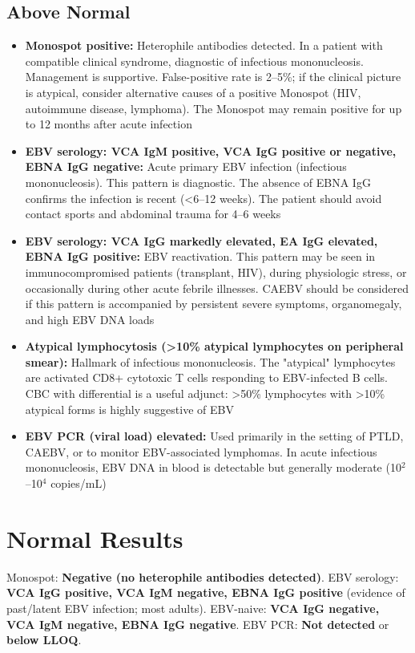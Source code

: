 \subsection*{Above Normal}
\begin{itemize}
  \item \textbf{Monospot positive:} Heterophile antibodies detected. In a patient with compatible clinical syndrome, diagnostic of infectious mononucleosis. Management is supportive. False-positive rate is 2--5\%; if the clinical picture is atypical, consider alternative causes of a positive Monospot (HIV, autoimmune disease, lymphoma). The Monospot may remain positive for up to 12 months after acute infection
  \item \textbf{EBV serology: VCA IgM positive, VCA IgG positive or negative, EBNA IgG negative:} Acute primary EBV infection (infectious mononucleosis). This pattern is diagnostic. The absence of EBNA IgG confirms the infection is recent (<6--12 weeks). The patient should avoid contact sports and abdominal trauma for 4--6 weeks
  \item \textbf{EBV serology: VCA IgG markedly elevated, EA IgG elevated, EBNA IgG positive:} EBV reactivation. This pattern may be seen in immunocompromised patients (transplant, HIV), during physiologic stress, or occasionally during other acute febrile illnesses. CAEBV should be considered if this pattern is accompanied by persistent severe symptoms, organomegaly, and high EBV DNA loads
  \item \textbf{Atypical lymphocytosis (>10\% atypical lymphocytes on peripheral smear):} Hallmark of infectious mononucleosis. The "atypical" lymphocytes are activated CD8+ cytotoxic T cells responding to EBV-infected B cells. CBC with differential is a useful adjunct: >50\% lymphocytes with >10\% atypical forms is highly suggestive of EBV
  \item \textbf{EBV PCR (viral load) elevated:} Used primarily in the setting of PTLD, CAEBV, or to monitor EBV-associated lymphomas. In acute infectious mononucleosis, EBV DNA in blood is detectable but generally moderate (10$^{2}$--10$^{4}$ copies/mL)
\end{itemize}

\section*{Normal Results}
Monospot: \textbf{Negative (no heterophile antibodies detected)}. EBV serology: \textbf{VCA IgG positive, VCA IgM negative, EBNA IgG positive} (evidence of past/latent EBV infection; most adults). EBV-naive: \textbf{VCA IgG negative, VCA IgM negative, EBNA IgG negative}. EBV PCR: \textbf{Not detected} or \textbf{below LLOQ}.

